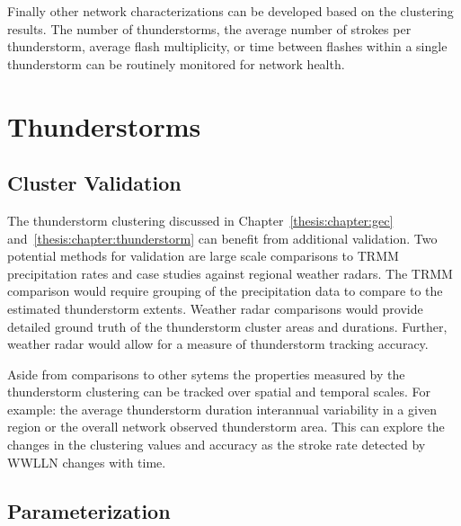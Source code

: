 Finally other network characterizations can be developed based on the clustering results.
The number of thunderstorms, the average number of strokes per thunderstorm, average flash multiplicity, or time between flashes within a single thunderstorm can be routinely monitored for network health.

\section{Thunderstorms}

\subsection{Cluster Validation}

The thunderstorm clustering discussed in Chapter~\ref{thesis:chapter:gec} and~\ref{thesis:chapter:thunderstorm} can benefit from additional validation.
Two potential methods for validation are large scale comparisons to TRMM precipitation rates and case studies against regional weather radars.
The TRMM comparison would require grouping of the precipitation data to compare to the estimated thunderstorm extents.
Weather radar comparisons would provide detailed ground truth of the thunderstorm cluster areas and durations.
Further, weather radar would allow for a measure of thunderstorm tracking accuracy.

Aside from comparisons to other sytems the properties measured by the thunderstorm clustering can be tracked over spatial and temporal scales.
For example: the average thunderstorm duration interannual variability in a given region or the overall network observed thunderstorm area.
This can explore the changes in the clustering values and accuracy as the stroke rate detected by WWLLN changes with time.

\subsection{Parameterization}

